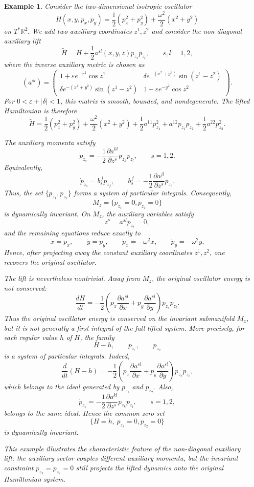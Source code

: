 \documentclass[10pt,a4paper]{article}
\newtheorem{example}{Example}
\begin{document}
\begin{example}
\label{ex:nondiagonalauxiliarylift}
Consider the two-dimensional isotropic oscillator
\[
H(x,y,p_x,p_y)
=
\frac{1}{2}(p_x^2+p_y^2)
+
\frac{\omega^2}{2}(x^2+y^2)
\]
on $T^*\mathbb R^2$. We add two auxiliary coordinates $z^1,z^2$ and consider the non-diagonal auxiliary lift
\[
\widetilde H
=
H
+
\frac{1}{2}a^{sl}(x,y,z)p_{z_s}p_{z_l},
\qquad s,l=1,2,
\]
where the inverse auxiliary metric is chosen as
\[
(a^{sl})
=
\begin{pmatrix}
1+\varepsilon e^{-x^2}\cos z^1
&
\delta e^{-(x^2+y^2)}\sin(z^1-z^2)
\\[2mm]
\delta e^{-(x^2+y^2)}\sin(z^1-z^2)
&
1+\varepsilon e^{-y^2}\cos z^2
\end{pmatrix}.
\]
For $0<\varepsilon+|\delta|<1$, this matrix is smooth, bounded, and nondegenerate. The lifted Hamiltonian is therefore
\[
\widetilde H
=
\frac{1}{2}(p_x^2+p_y^2)
+
\frac{\omega^2}{2}(x^2+y^2)
+
\frac{1}{2}a^{11}p_{z_1}^2
+
a^{12}p_{z_1}p_{z_2}
+
\frac{1}{2}a^{22}p_{z_2}^2 .
\]

The auxiliary momenta satisfy
\[
\dot p_{z_s}
=
-\frac{1}{2}
\frac{\partial a^{kl}}{\partial z^s}
p_{z_k}p_{z_l},
\qquad s=1,2.
\]
Equivalently,
\[
\dot p_{z_s}=b_s^{\,j}p_{z_j},
\qquad
b_s^{\,j}
=
-\frac{1}{2}
\frac{\partial a^{jl}}{\partial z^s}p_{z_l}.
\]
Thus, the set $\lbrace p_{z_1},p_{z_2}\rbrace$ forms a system of particular integrals. Consequently,
\[
M_z=\{p_{z_1}=0,p_{z_2}=0\}
\]
is dynamically invariant. On $M_z$, the auxiliary variables satisfy
\[
\dot z^s=a^{sl}p_{z_l}=0,
\]
and the remaining equations reduce exactly to
\[
\dot x=p_x,\qquad
\dot y=p_y,\qquad
\dot p_x=-\omega^2x,\qquad
\dot p_y=-\omega^2y.
\]
Hence, after projecting away the constant auxiliary coordinates $z^1,z^2$, one recovers the original oscillator.

The lift is nevertheless nontrivial. Away from $M_z$, the original oscillator energy is not conserved:
\[
\frac{dH}{dt}
=
-\frac{1}{2}
\left(
p_x\frac{\partial a^{sl}}{\partial x}
+
p_y\frac{\partial a^{sl}}{\partial y}
\right)
p_{z_s}p_{z_l}.
\]
Thus the original oscillator energy is conserved on the invariant submanifold $M_z$, but it is not generally a first integral of the full lifted system. More precisely, for each regular value $h$ of $H$, the family
\[
H-h,\qquad p_{z_1},\qquad p_{z_2}
\]
is a system of particular integrals. Indeed,
\[
\frac{d}{dt}(H-h)
=
-\frac{1}{2}
\left(
p_x\frac{\partial a^{sl}}{\partial x}
+
p_y\frac{\partial a^{sl}}{\partial y}
\right)
p_{z_s}p_{z_l},
\]
which belongs to the ideal generated by $p_{z_1}$ and $p_{z_2}$. Also,
\[
\dot p_{z_s}
=
-\frac{1}{2}
\frac{\partial a^{kl}}{\partial z^s}
p_{z_k}p_{z_l},
\qquad s=1,2,
\]
belongs to the same ideal. Hence the common zero set
\[
\{H=h,\ p_{z_1}=0,p_{z_2}=0\}
\]
is dynamically invariant.

This example illustrates the characteristic feature of the non-diagonal auxiliary lift: the auxiliary sector couples different auxiliary momenta, but the invariant constraint $p_{z_1}=p_{z_2}=0$ still projects the lifted dynamics onto the original Hamiltonian system.
\end{example}
\end{document}
